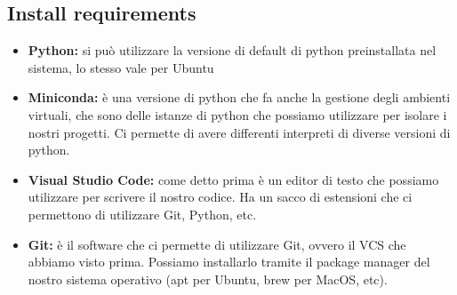 \documentclass[a4paper,12pt]{article}
\begin{document}
\subsection{Install requirements}
\begin{itemize}
    \item \textbf{Python: } si può utilizzare la versione di default di python preinstallata nel sistema, lo stesso vale per Ubuntu
    \item \textbf{Miniconda: } è una versione di python che fa anche la gestione degli ambienti virtuali, che sono delle istanze di python che possiamo utilizzare per isolare i nostri progetti. Ci permette di avere differenti interpreti di diverse versioni di python.
    \item \textbf{Visual Studio Code: } come detto prima è un editor di testo che possiamo utilizzare per scrivere il nostro codice. Ha un sacco di estensioni che ci permettono di utilizzare Git, Python, etc.
    \item \textbf{Git: } è il software che ci permette di utilizzare Git, ovvero il VCS che abbiamo visto prima. Possiamo installarlo tramite il package manager del nostro sistema operativo (apt per Ubuntu, brew per MacOS, etc).
\end{itemize}
\end{document}
